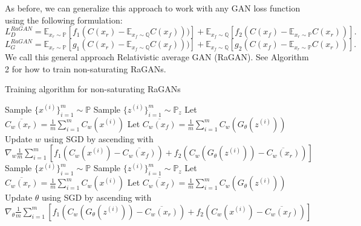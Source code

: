 \documentclass{article}
\begin{document}
As before, we can generalize this approach to work with any GAN loss function using the following formulation:
\begin{equation}
L_D^{RaGAN} = \mathbb{E}_{x_r \sim \mathbb{P}}\left[ f_1\left( C(x_r)-\mathbb{E}_{x_f \sim \mathbb{Q}} C(x_f) \right)) \right] + \mathbb{E}_{x_f \sim \mathbb{Q}} \left[ f_2 \left( C(x_f)-\mathbb{E}_{x_r \sim \mathbb{P}} C(x_r) \right) \right].
\end{equation}
\begin{equation}
L_G^{RaGAN} = \mathbb{E}_{x_r \sim \mathbb{P}}\left[ g_1 \left( C(x_r)-\mathbb{E}_{x_f \sim \mathbb{Q}} C(x_f) \right)) \right] + \mathbb{E}_{x_f \sim \mathbb{Q}} \left[ g_2 \left( C(x_f)-\mathbb{E}_{x_r \sim \mathbb{P}} C(x_r) \right) \right].
\end{equation}
We call this general approach Relativistic average GAN (RaGAN). See Algorithm 2 for how to train non-saturating RaGANs.

\begin{algorithm}  
	\caption{Training algorithm for non-saturating RaGANs
		\label{alg:1}}
	\begin{algorithmic}
		\State Sample $\{x^{(i)}\}_{i=1}^m \sim \mathbb{P}$
		\State Sample $\{z^{(i)}\}_{i=1}^m \sim \mathbb{P}_z$
		\State Let $\overline{C_w(x_r)} = \frac{1}{m} \sum_{i=1}^{m} C_w(x^{(i)})$
		\State Let $\overline{C_w(x_f)} = \frac{1}{m} \sum_{i=1}^{m} C_w(G_{\theta}(z^{(i)}))$
		\State Update $w$ using SGD by ascending with 
		\State \quad $\nabla_{w} \frac{1}{m} \sum_{i=1}^{m} \left[ f_1(C_w(x^{(i)})-\overline{C_w(x_f)}) +  f_2(C_w(G_{\theta}(z^{(i)}))-\overline{C_w(x_r)}) \right]$
		\EndFor 
		\State Sample $\{x^{(i)}\}_{i=1}^m \sim \mathbb{P}$
		\State Sample $\{z^{(i)}\}_{i=1}^m \sim \mathbb{P}_z$
		\State Let $\overline{C_w(x_r)} = \frac{1}{m} \sum_{i=1}^{m} C_w(x^{(i)})$
		\State Let $\overline{C_w(x_f)} = \frac{1}{m} \sum_{i=1}^{m} C_w(G_{\theta}(z^{(i)}))$
		\State Update $\theta$ using SGD by ascending with 
		\State \quad $\nabla_{\theta} \frac{1}{m} \sum_{i=1}^{m} \left[ f_1(C_w(G_{\theta}(z^{(i)}))-\overline{C_w(x_r)}) + f_2(C_w(x^{(i)})-\overline{C_w(x_f)}) \right]$
		\EndWhile
	\end{algorithmic}
\end{algorithm}
\end{document}
